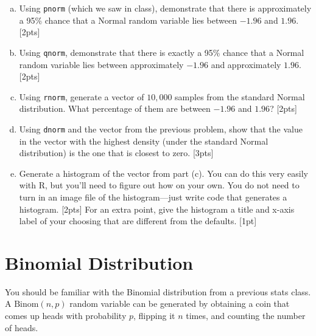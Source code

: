 \documentclass[12pt]{article}
\newcommand{\Binom}{\text{Binom}}
\begin{document}
\begin{enumerate}[(a)]
	\item Using \verb|pnorm| (which we saw in class), demonstrate that there is approximately a 95\% chance that a Normal random variable lies between $-1.96$ and $1.96$. [2pts]
	\item Using \verb|qnorm|, demonstrate that there is exactly a 95\% chance that a Normal random variable lies between approximately $-1.96$ and approximately $1.96$. [2pts]
	\item Using \verb|rnorm|, generate a vector of $10,000$ samples from the standard Normal distribution. What percentage of them are between $-1.96$ and $1.96$? [2pts]
	\item Using \verb|dnorm| and the vector from the previous problem, show that the value in the vector with the highest density (under the standard Normal distribution) is the one that is closest to zero. [3pts]
	\item Generate a histogram of the vector from part (c). You can do this very easily with R, but you'll need to figure out how on your own. You do not need to turn in an image file of the histogram---just write code that generates a histogram. [2pts] For an extra point, give the histogram a title and x-axis label of your choosing that are different from the defaults. [1pt]
\end{enumerate}

\section{Binomial Distribution}

You should be familiar with the Binomial distribution from a previous stats class. A $\Binom(n,p)$ random variable can be generated by obtaining a coin that comes up heads with probability $p$, flipping it $n$ times, and counting the number of heads.
\end{document}
